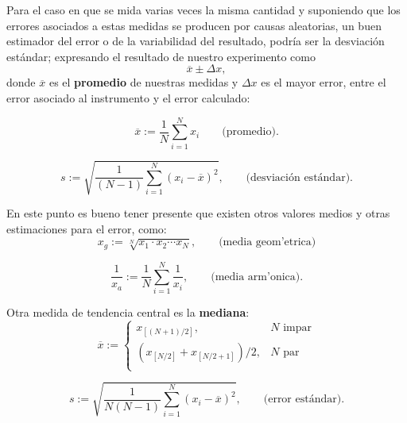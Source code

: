 \documentclass[a4paper]{report}
\begin{document}
Para el caso en que se mida varias veces la misma cantidad y suponiendo
que los errores asociados a estas medidas se producen por causas
aleatorias, un buen estimador del error o de la variabilidad del resultado, podría ser la desviación estándar; expresando el resultado de nuestro experimento como
\begin{equation}
\overline{x}\pm \Delta x,
\end{equation}
donde $\overline{x}$ es el \textbf{promedio} de nuestras medidas y $\Delta x$ es el
mayor error, entre el error asociado al instrumento y el error
calculado:

\begin{equation}
\overline{x}:=\frac{1}{N}\sum_{i=1}^N x_i\qquad \text{(promedio).}
\end{equation}

\begin{equation}
s:=\sqrt{\frac{1}{(N-1)}\sum_{i=1}^N(x_i-\overline{x})^2}, \qquad \text{(desviación estándar).}
\end{equation} 

En este punto es bueno tener presente que existen otros valores medios y otras estimaciones para el error, como:
\begin{equation}
x_g:=\sqrt[N]{x_1\cdot x_2\cdots x_N}, \qquad \text{(media geom'etrica)}
\end{equation}

\begin{equation}
\frac{1}{x_a}:=\frac{1}{N}\sum_{i=1}^N\frac{1}{x_i}, \qquad \text{(media arm'onica).}
\end{equation}

Otra medida de tendencia central es la \textbf{mediana}:
\begin{equation}
\overline{x}:=\left\lbrace
		\begin{array}{ll}
			x_{[(N+1)/2]}, & N \text{ impar} \\
            \left(x_{[N/2]}+x_{[N/2+1]}\right)/2, & N \text{ par} \\
        \end{array}\right.
\end{equation}

\begin{equation}
s:=\sqrt{\frac{1}{N(N-1)}\sum_{i=1}^N(x_i-\overline{x})^2}, \qquad \text{(error estándar).}
\end{equation} 
\end{document}
